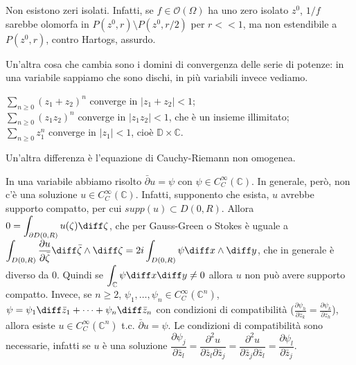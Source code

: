 \begin{ex}
  Non esistono zeri isolati. Infatti, se $f \in \mathcal{O}(\Omega)$ ha uno zero isolato $z^0$, $1/f$ sarebbe olomorfa in $P(z^0,r) \setminus P(z^0, r/2)$ per $r<<1$, ma non estendibile a $P(z^0, r)$, contro Hartogs, assurdo.
\end{ex}

Un'altra cosa che cambia sono i domini di convergenza delle serie di potenze: in una variabile sappiamo che sono dischi, in più variabili invece vediamo.

\begin{ex}
  $\displaystyle \sum_{n \ge 0} (z_1+z_2)^n$ converge in $|z_1+z_2|<1$; \\
  $\displaystyle \sum_{n \ge 0} (z_1z_2)^n$ converge in $|z_1z_2|<1$, che è un insieme illimitato; \\
  $\displaystyle \sum_{n \ge 0} z_1^n$ converge in $|z_1|<1$, cioè $\mathbb{D}\times \mathbb{C}$.
\end{ex}

Un'altra differenza è l'equazione di Cauchy-Riemann non omogenea.

\begin{ex}
  In una variabile abbiamo risolto $\bar{\partial}u=\psi$ con $\psi \in C^\infty_C(\mathbb{C})$. In generale, però, non c'è una soluzione $u \in C^\infty_C(\mathbb{C})$. Infatti, supponento che esista, $u$ avrebbe supporto compatto, per cui $supp(u) \subset D(0,R)$.
  Allora $\displaystyle 0=\int_{\partial D(0,R)} u(\zeta)\diff \zeta$, che per Gauss-Green o Stokes è uguale a $\displaystyle \int_{D(0,R)} \dfrac{\partial u}{\partial \bar{\zeta}} \diff\bar{\zeta}\wedge\diff\zeta=2i\int_{D(0,R)} \psi \diff x\wedge\diff y$, che in generale è diverso da $0$. Quindi se $\displaystyle \int_{\mathbb{C}} \psi \diff x \diff y\not=0$ allora $u$ non può avere supporto compatto.
  Invece, se $n \ge 2$, $\psi_1, \dots, \psi_n \in C^\infty_C(\mathbb{C}^n)$, $\psi=\psi_1\diff \bar{z}_1+\dots+\psi_n\diff \bar{z}_n$ con condizioni di compatibilità ($\frac{\partial \psi_h}{\partial \bar{z}_k}=\frac{\partial \psi_k}{\partial \bar{z}_h}$), allora esiste $u \in C^\infty_C(\mathbb{C}^n)$ t.c. $\bar{\partial}u=\psi$.
  Le condizioni di compatibilità sono necessarie, infatti se $u$ è una soluzione $\dfrac{\partial \psi_j}{\partial \bar{z}_l}=\dfrac{\partial^2u}{\partial \bar{z}_l\partial \bar{z}_j}=\dfrac{\partial^2u}{\partial \bar{z}_j\partial \bar{z}_l}=\dfrac{\partial \psi_l}{\partial \bar{z}_j}$.
\end{ex}


